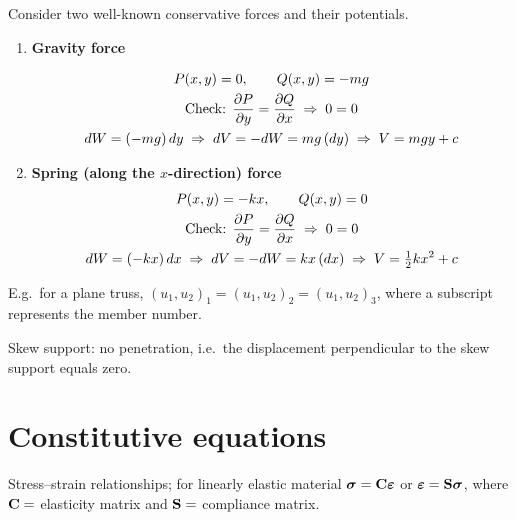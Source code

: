 Consider two well-known conservative forces and their potentials.
\begin{enumerate}[label=(\alph*)]
  \item \textbf{Gravity force}
    \begin{fig}
      
    \end{fig}
    \begin{gather*}
      P(x,y) = 0, \qquad Q(x,y) = -mg \\
      \text{Check: } \frac{\partial P}{\partial y} = \frac{\partial Q}{\partial x} \;\Rightarrow\; 0 = 0 \\
      dW = (-mg)\,dy \;\Rightarrow\; dV = -dW = mg\,(dy) \;\Rightarrow\; V = mgy + c
    \end{gather*}
  \item \textbf{Spring (along the $x$-direction) force}
    \begin{gather*}
      P(x,y) = -kx, \qquad Q(x,y) = 0 \\
      \text{Check: } \frac{\partial P}{\partial y} = \frac{\partial Q}{\partial x} \;\Rightarrow\; 0 = 0 \\
      dW = (-kx)\,dx \;\Rightarrow\; dV = -dW = kx\,(dx) \;\Rightarrow\; V = \tfrac12 kx^2 + c
    \end{gather*}
\end{enumerate}

E.g.\ for a plane truss, $(u_1,u_2)_1 = (u_1,u_2)_2 = (u_1,u_2)_3$, where a subscript represents the member number.
\begin{fig}
  
\end{fig}

Skew support: no penetration, i.e.\ the displacement perpendicular to the skew support equals zero.
\begin{fig}
  
\end{fig}

\section{Constitutive equations}
Stress--strain relationships; for linearly elastic material $\bm{\sigma} = \mathbf{C}\bm{\varepsilon}$ or $\bm{\varepsilon} = \mathbf{S}\bm{\sigma}$, where $\mathbf{C} =$ elasticity matrix and $\mathbf{S} =$ compliance matrix.

